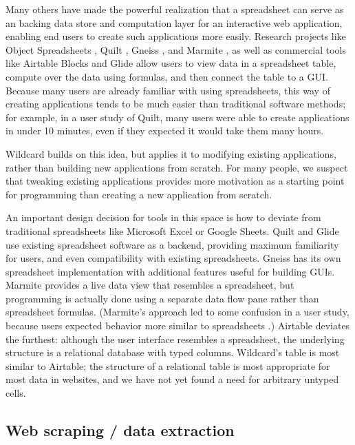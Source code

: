 \documentclass[english,submission]{programming}
\begin{document}
Many others have made the powerful realization that a spreadsheet can
serve as an backing data store and computation layer for an interactive
web application, enabling end users to create such applications more
easily. Research projects like Object Spreadsheets
\autocite{mccutchen2016}, Quilt \autocite{benson2014}, Gneiss
\autocite{chang2014}, and Marmite \autocite{wong2007}, as well as
commercial tools like Airtable Blocks \autocite{zotero-79} and Glide
\autocite{zotero-81} allow users to view data in a spreadsheet table,
compute over the data using formulas, and then connect the table to a
GUI. Because many users are already familiar with using spreadsheets,
this way of creating applications tends to be much easier than
traditional software methods; for example, in a user study of Quilt,
many users were able to create applications in under 10 minutes, even if
they expected it would take them many hours.

Wildcard builds on this idea, but applies it to modifying existing
applications, rather than building new applications from scratch. For
many people, we suspect that tweaking existing applications provides
more motivation as a starting point for programming than creating a new
application from scratch.

An important design decision for tools in this space is how to deviate
from traditional spreadsheets like Microsoft Excel or Google Sheets.
Quilt and Glide use existing spreadsheet software as a backend,
providing maximum familiarity for users, and even compatibility with
existing spreadsheets. Gneiss has its own spreadsheet implementation
with additional features useful for building GUIs. Marmite provides a
live data view that resembles a spreadsheet, but programming is actually
done using a separate data flow pane rather than spreadsheet formulas.
(Marmite's approach led to some confusion in a user study, because users
expected behavior more similar to spreadsheets \autocite{wong2007}.)
Airtable deviates the furthest: although the user interface resembles a
spreadsheet, the underlying structure is a relational database with
typed columns. Wildcard's table is most similar to Airtable; the
structure of a relational table is most appropriate for most data in
websites, and we have not yet found a need for arbitrary untyped cells.

\hypertarget{web-scraping-data-extraction}{%
\subsection{Web scraping / data
extraction}\label{web-scraping-data-extraction}}
\end{document}
